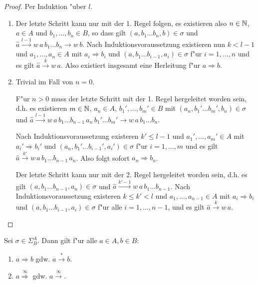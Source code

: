 \documentclass[12pt,a4paper]{article}
\begin{document}
\begin{proof}
  Per Induktion "uber $l$.
  \begin{enumerate}
  \item Der letzte Schritt kann nur mit der 1. Regel folgen, es existieren also $n\in\mathbb N$, $a \in A$
    und $b_1,\ldots,b_n \in B$, so dass gilt $(a,b_1 \ldots b_n,b) \in \sigma$ und
    $\hat{a} \stackrel{l-1}{\to} w\,a\,b_1 \ldots b_n \to w\,b$. Nach Induktionsvoraussetzung existieren
    nun $k < l-1$ und $a_1,\ldots,a_n \in A$ mit $a_i \Rightarrow b_i$ und $(a,b_1 \ldots b_{i-1},a_i)\in\sigma$
    f"ur $i=1,\ldots,n$ und es gilt $\hat{a} \stackrel{k}{\to} w\,a$. Also existiert insgesamt eine
    Herleitung f"ur $a \Rightarrow b$.
  \item Trivial im Fall von $n = 0$.

    F"ur $n > 0$ muss der letzte Schritt mit der 1. Regel hergeleitet worden sein, d.h. es existieren
    $m \in \mathbb N$, $a_n \in A$, $b_1',\ldots,b_m' \in B$ mit $(a_n,b_1' \ldots b_m',b_n) \in \sigma$ und
    $\hat{a} \stackrel{l-1}{\to} w\,a\,b_1 \ldots b_{n-1}\,a_n\,b_1'\ldots b_m' \to w\,a\,b_1 \ldots b_n$.

    Nach Induktionsvoraussetzung existeren $k' \le l-1$ und $a_1',\ldots,a_m' \in A$ mit
    $a_i' \Rightarrow b_i'$ und $(a_n,b_1' \ldots b_{i-1}',a_i') \in \sigma$ f"ur $i=1,\ldots,m$
    und es gilt $\hat{a} \stackrel{k'}{\to} w\,a\,b_1 \ldots b_{n-1}\,a_n$. Also folgt sofort
    $a_n \Rightarrow b_n$.

    Der letzte Schritt kann nur mit der 2. Regel hergeleitet worden sein, d.h. es gilt
    $(a,b_1 \ldots b_{n-1},a_n) \in \sigma$ und $\hat{a} \stackrel{k'-1}{\to} w\,a\,b_1 \ldots b_{n-1}$.
    Nach Induktionsvoraussetzung existeren $k \le k' < l$ und $a_1,\ldots,a_{n-1} \in A$ mit
    $a_i \Rightarrow b_i$ und $(a,b_1 \ldots b_{i-1},a_i) \in \sigma$ f"ur alle $i=1,\ldots,n-1$, und
    es gilt $\hat{a} \stackrel{k}{\to} w\,a$.
  \end{enumerate}
\end{proof}


\begin{theorem}["Aquivalenz]
  Sei $\sigma \in \Sigma^A_B$. Dann gilt f"ur alle $a \in A, b \in B$:
  \begin{enumerate}
  \item $a \Rightarrow b$ gdw. $a \stackrel{*}{\to} b$.
  \item $a \stackrel{\infty}{\Rightarrow}$ gdw. $a \stackrel{\infty}{\to}$.
  \end{enumerate}
\end{theorem}
\end{document}

